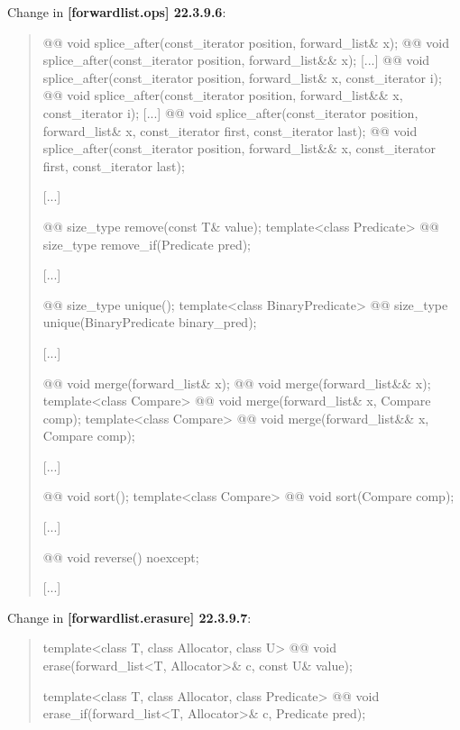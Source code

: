 \documentclass{wg21}
\begin{document}
Change in \textbf{[forwardlist.ops] 22.3.9.6}:
\begin{quote}
\begin{itemdecl}
@@ void splice_after(const_iterator position, forward_list& x);
@@ void splice_after(const_iterator position, forward_list&& x);
[...]
@@ void splice_after(const_iterator position, forward_list& x, const_iterator i);
@@ void splice_after(const_iterator position, forward_list&& x, const_iterator i);
[...]
@@ void splice_after(const_iterator position, forward_list& x, const_iterator first,
const_iterator last);
@@ void splice_after(const_iterator position, forward_list&& x, const_iterator first,
const_iterator last);
\end{itemdecl}
[...]
\begin{itemdecl}
@@ size_type remove(const T& value);
template<class Predicate> @@ size_type remove_if(Predicate pred);
\end{itemdecl}
[...]
\begin{itemdecl}
@@ size_type unique();
template<class BinaryPredicate> @@ size_type unique(BinaryPredicate binary_pred);
\end{itemdecl}
[...]
\begin{itemdecl}
@@ void merge(forward_list& x);
@@ void merge(forward_list&& x);
template<class Compare> @@ void merge(forward_list& x, Compare comp);
template<class Compare> @@ void merge(forward_list&& x, Compare comp);
\end{itemdecl}
[...]
\begin{itemdecl}
@@ void sort();
template<class Compare> @@ void sort(Compare comp);
\end{itemdecl}
[...]
\begin{itemdecl}
@@ void reverse() noexcept;
\end{itemdecl}
[...]
\end{quote}

Change in \textbf{[forwardlist.erasure] 22.3.9.7}:
\begin{quote}
\begin{itemdecl}
template<class T, class Allocator, class U>
  @@ void erase(forward_list<T, Allocator>& c, const U& value);
  
template<class T, class Allocator, class Predicate>
  @@ void erase_if(forward_list<T, Allocator>& c, Predicate pred);  
\end{itemdecl}
\end{quote}
\end{document}
